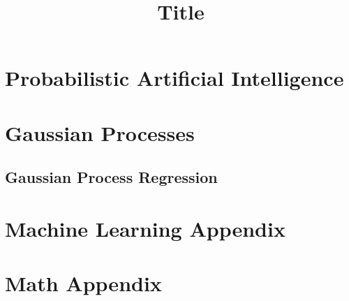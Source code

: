 \documentclass[
  fourColumns,
  landscape
]{formularyETH/formularyETH}
\title{Title}
\begin{document}
\section*{Probabilistic Artificial Intelligence}\label{sec:probabilistic_artificial_intelligence}
\section{Gaussian Processes }\label{sec:gaussian_processes}
  \subsection{Gaussian Process Regression}\label{subsec:gaussian_process_regression}


% 
\newpage  
\section*{Machine Learning Appendix}\label{sec:ml_appendix}
  
\newpage  
\section*{Math Appendix}\label{sec:math_appendix}

\end{document}
